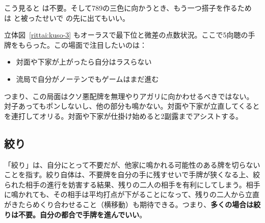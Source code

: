 \documentclass[../nankiru_main.tex]{subfiles}
\renewcommand{\renderOption}{0}
\begin{document}
こう見ると  は不要。そして789の三色に向かうとき、もう一つ搭子を作るため  は  と被ったせいで  の先に出てもいい。

\begin{rittai}[h]
  \centering
  
  
  \caption{}
  \label{rittai:kuso-2}
\end{rittai}

立体図~\ref{rittai:kuso-3} もオーラスで最下位と微差の点数状況。ここで5向聴の手牌をもらった。この場面で注目したいのは：

\begin{itemize}
\item 対面や下家が上がったら自分はラスらない
\item 流局で自分がノーテンでもゲームはまだ進む
\end{itemize}

つまり、この局面はクソ悪配牌を無理やりアガリに向かわせるべきではない。 対子あってもポンしないし、他の部分も鳴かない。対面や下家が立直してくると  を連打してオリる。対面や下家が仕掛け始めると2副露までアシストする\citep{shibukawa-haipai}。

\begin{rittai}[h]
  \centering
  
  
  \caption{}
  \label{rittai:kuso-3}
\end{rittai}


\subsection{絞り}

\renewcommand{\renderOption}{1}

「絞り」は、自分にとって不要だが、他家に鳴かれる可能性のある牌を切らないことを指す\citep{gendai-shibori}。絞り自体は、不要牌を自分の手に残すせいで手牌が狭くなる上、絞られた相手の進行を妨害する結果、残りの二人の相手を有利にしてしまう。相手に鳴かれても、その相手は平均打点が下がることになって、残りの二人から立直がきたらめくり合わせること（横移動）も期待できる。つまり、\textbf{多くの場合は絞りは不要。自分の都合で手牌を進んでいい}。
\end{document}
